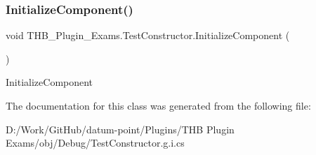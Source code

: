 \subsubsection{\texorpdfstring{Initialize\+Component()}{InitializeComponent()}\hspace{0.1cm}{\footnotesize\ttfamily [2/2]}}
{\footnotesize\ttfamily void T\+H\+B\+\_\+\+Plugin\+\_\+\+Exams.\+Test\+Constructor.\+Initialize\+Component (\begin{DoxyParamCaption}{ }\end{DoxyParamCaption})}



Initialize\+Component 



The documentation for this class was generated from the following file\+:\begin{DoxyCompactItemize}
\item 
D\+:/\+Work/\+Git\+Hub/datum-\/point/\+Plugins/\+T\+H\+B Plugin Exams/obj/\+Debug/Test\+Constructor.\+g.\+i.\+cs\end{DoxyCompactItemize}
